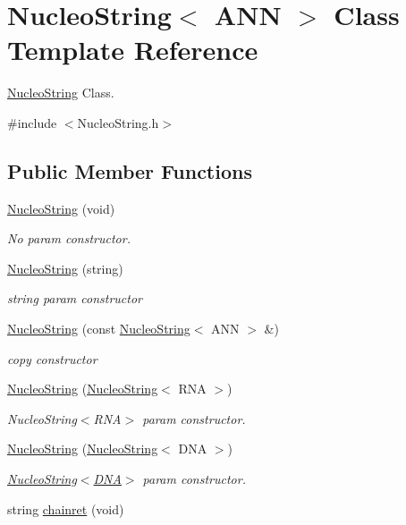 \hypertarget{class_nucleo_string}{\section{Nucleo\-String$<$ A\-N\-N $>$ Class Template Reference}
\label{class_nucleo_string}
}


\hyperlink{class_nucleo_string}{Nucleo\-String} Class.  




{\ttfamily \#include $<$Nucleo\-String.\-h$>$}

\subsection*{Public Member Functions}
\begin{DoxyCompactItemize}
\item 
\hyperlink{class_nucleo_string_a210a77c2355c60565b23b382dda1fa8d}{Nucleo\-String} (void)
\begin{DoxyCompactList}\small\item\em No param constructor. \end{DoxyCompactList}\item 
\hyperlink{class_nucleo_string_ac51d2c5f9b4668b948ac1d68c34ab96c}{Nucleo\-String} (string)
\begin{DoxyCompactList}\small\item\em string param constructor \end{DoxyCompactList}\item 
\hyperlink{class_nucleo_string_a729c218b82414aac08cecf1a9fced63e}{Nucleo\-String} (const \hyperlink{class_nucleo_string}{Nucleo\-String}$<$ A\-N\-N $>$ \&)
\begin{DoxyCompactList}\small\item\em copy constructor \end{DoxyCompactList}\item 
\hyperlink{class_nucleo_string_a9a7ff90b65689a234b942c5352e3b619}{Nucleo\-String} (\hyperlink{class_nucleo_string}{Nucleo\-String}$<$ R\-N\-A $>$)
\begin{DoxyCompactList}\small\item\em Nucleo\-String$<$\-R\-N\-A$>$ param constructor. \end{DoxyCompactList}\item 
\hyperlink{class_nucleo_string_ab89a279f41a98a25dbdedc6d221b0aa4}{Nucleo\-String} (\hyperlink{class_nucleo_string}{Nucleo\-String}$<$ D\-N\-A $>$)
\begin{DoxyCompactList}\small\item\em \hyperlink{class_nucleo_string}{Nucleo\-String$<$\-D\-N\-A$>$} param constructor. \end{DoxyCompactList}\item 
\hypertarget{class_nucleo_string_a1d9d7951dc4016b3c2e8278ca384de42}{string \hyperlink{class_nucleo_string_a1d9d7951dc4016b3c2e8278ca384de42}{chainret} (void)}\label{class_nucleo_string_a1d9d7951dc4016b3c2e8278ca384de42}


\end{DoxyCompactItemize}
